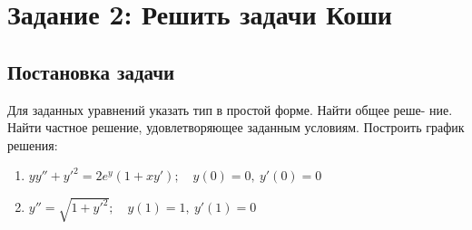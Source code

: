 \section{Задание 2: Решить задачи Коши}
    \subsection{Постановка задачи}
        Для заданных уравнений указать тип в простой форме. Найти общее реше-
        ние. Найти частное решение, удовлетворяющее заданным условиям. Построить
        график решения:

        \begin{enumerate}
            \item \( yy'' + y'^2 = 2e^y(1 + xy'); \quad y(0) = 0, ~ y'(0) = 0 \)
            
            \item \( y'' = \sqrt{1 + y'^2}; \quad y(1) = 1, ~ y'(1) = 0 \)
        \end{enumerate}

